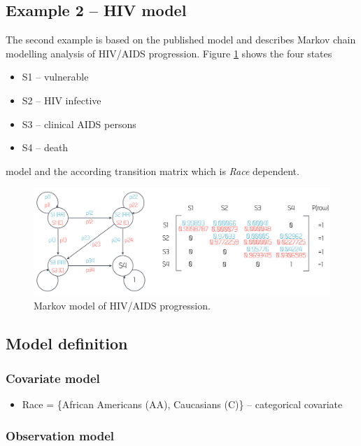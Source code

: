 \subsection{Example 2 -- HIV model}
\label{subsec:exp3}
The second example is based on the published model \cite{Lee:2014kq}
and describes Markov chain modelling analysis of HIV/AIDS progression.
Figure \ref{fig:Markov_HIV} shows the four states  
\begin{itemize}
\item 
S1 -- vulnerable
\item 
S2 -- HIV infective
\item 
S3 -- clinical AIDS persons
\item 
S4 -- death
\end{itemize}
model and the according transition matrix which is \emph{Race} dependent.

\begin{figure}[ht!]
\centering
  \includegraphics[width=140mm]{pics/Markov_HIV.pdf}
 \caption{Markov model of HIV/AIDS progression.}
 \label{fig:Markov_HIV}
\end{figure}

\subsection*{Model definition}

\subsubsection*{Covariate model}
\begin{itemize}
\item
Race = \{African Americans (AA), Caucasians (C)\} -- categorical covariate
\end{itemize}

\subsubsection*{Observation model}

